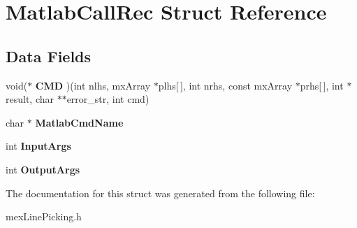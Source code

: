 \hypertarget{struct_matlab_call_rec}{\section{Matlab\-Call\-Rec Struct Reference}
\label{struct_matlab_call_rec}
}
\subsection*{Data Fields}
\begin{DoxyCompactItemize}
\item 
\hypertarget{struct_matlab_call_rec_a07c15976aef5c8ce33f998dac9277fb9}{void($\ast$ {\bfseries C\-M\-D} )(int nlhs, mx\-Array $\ast$plhs\mbox{[}$\,$\mbox{]}, int nrhs, const mx\-Array $\ast$prhs\mbox{[}$\,$\mbox{]}, int $\ast$result, char $\ast$$\ast$error\-\_\-str, int cmd)}\label{struct_matlab_call_rec_a07c15976aef5c8ce33f998dac9277fb9}

\item 
\hypertarget{struct_matlab_call_rec_a2430e0f1c628fdbd3cd8fb74183f627d}{char $\ast$ {\bfseries Matlab\-Cmd\-Name}}\label{struct_matlab_call_rec_a2430e0f1c628fdbd3cd8fb74183f627d}

\item 
\hypertarget{struct_matlab_call_rec_a0f1ff7184b84242943b4c5b01ed89161}{int {\bfseries Input\-Args}}\label{struct_matlab_call_rec_a0f1ff7184b84242943b4c5b01ed89161}

\item 
\hypertarget{struct_matlab_call_rec_a4a7c53dd59fd0abb655deffe31e0a5e2}{int {\bfseries Output\-Args}}\label{struct_matlab_call_rec_a4a7c53dd59fd0abb655deffe31e0a5e2}

\end{DoxyCompactItemize}


The documentation for this struct was generated from the following file\-:\begin{DoxyCompactItemize}
\item 
mex\-Line\-Picking.\-h\end{DoxyCompactItemize}
